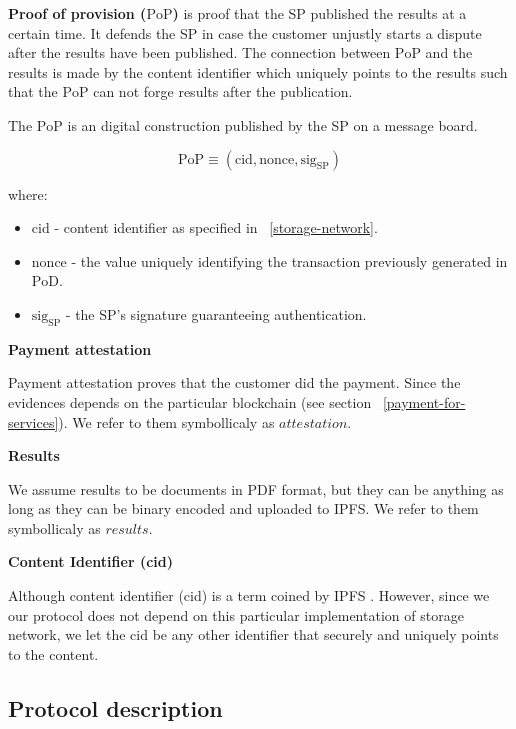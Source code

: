 \documentclass{ieeeaccess}
\begin{document}
\noindent \textbf
{Proof of provision ($\mathrm{PoP}$)}\label{proof-of-provision} is proof that the SP published the results at a certain time. It defends the SP in case the customer unjustly starts a dispute after the results have been published. The connection between $\mathrm{PoP}$ and the results is made by the content identifier which uniquely points to the results such that the $\mathrm{PoP}$ can not forge results after the publication.

The $\mathrm{PoP}$ is an digital construction published by the SP on a message board.

\[\mathrm{PoP} \equiv (\mathrm{cid}, \mathrm{nonce}, \mathrm{sig}_\mathrm{SP})\]

where:

\begin{itemize}

\item
  \(\mathrm{cid}\) - content identifier as specified in ~\ref{storage-network}.
\item
  \(\mathrm{nonce}\) - the value uniquely identifying the transaction previously generated in $\mathrm{PoD}$.
\item
  \(\mathrm{sig}_\mathrm{SP}\) - the SP's signature guaranteeing authentication.
\end{itemize}

\noindent \textbf
{Payment attestation}\label{payment-attestation}

Payment attestation proves that the customer did the payment. Since the
evidences depends on the particular blockchain (see section ~\ref{payment-for-services}). We refer to them symbollicaly as
\(attestation\).

\noindent \textbf
{Results}\label{results}

We assume results to be documents in PDF format, but they can be
anything as long as they can be binary encoded and uploaded to IPFS. We
refer to them symbollicaly as \(results\).

\noindent \textbf
{Content Identifier (cid)}\label{content-identifier-cid}

Although content identifier (cid) is a term coined by IPFS
\cite{Contenta59}. However, since we our protocol does not depend on
this particular implementation of storage network, we let the cid be any
other identifier that securely and uniquely points to the content.

\subsection{Protocol description}\label{protocol-description}
\end{document}
